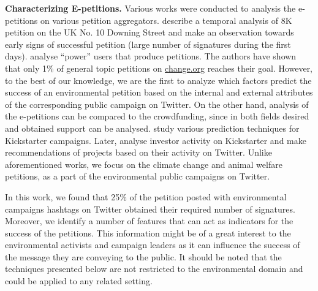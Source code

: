 \textbf{Characterizing E-petitions.} Various works were conducted to analysis the e-petitions on various petition aggregators.
\citeauthor{Hale2013}  describe a temporal analysis of 8K petition on the UK No. 10 Downing Street and make an observation towards early signs of successful petition (large number of signatures during the first days).
\citeauthor{Huang2015}  analyse ``power'' users that produce petitions. The authors have shown that only 1\% of general topic petitions on \url{change.org} reaches their goal.
However, to the best of our knowledge, we are the first to analyze which factors predict the success of an environmental petition based on the internal and external attributes of the corresponding public campaign on Twitter.
On the other hand, analysis of the e-petitions can be compared to the crowdfunding, since in both fields desired and obtained support can be analysed.
\citeauthor{Etter2013}  study various prediction techniques for Kickstarter campaigns.
Later, \citeauthor{An2014}  analyse investor activity on Kickstarter and make recommendations of projects based on their activity on Twitter. Unlike aforementioned works, we focus on the climate change and animal welfare petitions, as a part of the environmental public campaigns on Twitter.


In this work, we found that 25\% of the petition posted with environmental campaigns hashtags on Twitter obtained their required number of signatures.
Moreover, we identify a number of features that can act as indicators for the success of the petitions.
This information might be of a great interest to the environmental activists and campaign leaders as it can influence the success of the message they are conveying to the public.
It should be noted that the techniques presented below are not restricted to the environmental domain and could be applied to any related setting.

